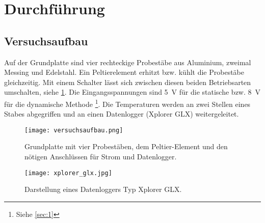 \section{Durchführung}
\subsection{Versuchsaufbau}
Auf der Grundplatte sind vier rechteckige Probestäbe aus Aluminium, zweimal Messing
und Edelstahl. Ein Peltierelement erhitzt bzw. kühlt die Probestäbe gleichzeitig.
Mit einem Schalter lässt sich zwischen diesen beiden Betriebsarten umschalten, siehe \ref{fig:1}.
Die Eingangsspannungen sind \SI{5}{\volt} für die statische bzw. \SI{8}{\volt}
für die dynamische Methode \footnote{Siehe \ref{sec:1}}. Die Temperaturen werden
an zwei Stellen eines Stabes abgegriffen und an einen Datenlogger (Xplorer GLX)
weitergeleitet.
\begin{figure}[t]
  \centering
  \texttt{[image: versuchsaufbau.png]}
  \caption{Grundplatte mit vier Probestäben, dem Peltier-Element und den nötigen Anschlüssen
  für Strom und Datenlogger.}
  \label{fig:1}
\end{figure}
\begin{figure}
  \centering
  \texttt{[image: xplorer\_glx.jpg]}
  \caption{Darstellung eines Datenloggers Typ Xplorer GLX.}
  \label{fig:2}
\end{figure}
